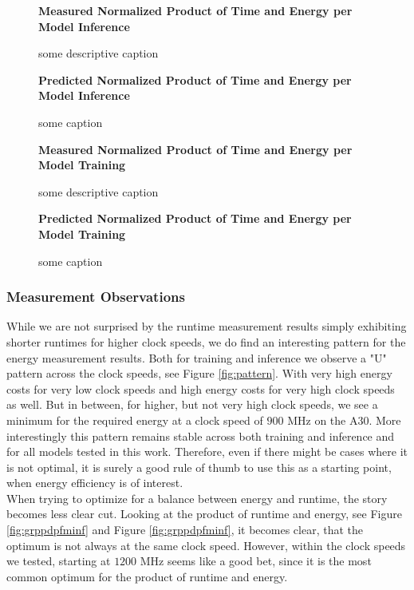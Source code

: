\begin{figure}[htbp]
    \centering
    \parbox{1.1\textwidth}{\centering\textbf{Measured Normalized Product of Time and Energy per Model Inference}}
    \caption{some descriptive caption}
    \label{fig:grppdpfminf}
    \vspace{0.2cm}
    \parbox{1.1\textwidth}{\centering\textbf{Predicted Normalized Product of Time and Energy per Model Inference}}
    \caption{some caption}
    \label{fig:grppdppredinf}
\end{figure}



\begin{figure}[htbp]
    \centering
    \parbox{1.1\textwidth}{\centering\textbf{Measured Normalized Product of Time and Energy per Model Training}}
    \caption{some descriptive caption}
    \label{fig:grppdpfmtrain}
    \vspace{0.2cm}
    \parbox{1.1\textwidth}{\centering\textbf{Predicted Normalized Product of Time and Energy per Model Training}}
    \caption{some caption}
    \label{fig:grppdppredtrain}
\end{figure}

\subsubsection{Measurement Observations}
While we are not surprised by the runtime measurement results simply exhibiting shorter runtimes for higher clock speeds, we do find an interesting pattern for the energy measurement results. Both for training and inference we observe a "U" pattern across the clock speeds, see Figure \ref{fig:pattern}. With very high energy costs for very low clock speeds and high energy costs for very high clock speeds as well. But in between, for higher, but not very high clock speeds, we see a minimum for the required energy at a clock speed of $900$ MHz on the A30. More interestingly this pattern remains stable across both training and inference and for all models tested in this work. Therefore, even if there might be cases where it is not optimal, it is surely a good rule of thumb to use this as a starting point, when energy efficiency is of interest. \\
When trying to optimize for a balance between energy and runtime, the story becomes less clear cut. Looking at the product of runtime and energy, see Figure \ref{fig:grppdpfminf} and Figure \ref{fig:grppdpfminf}, it becomes clear, that the optimum is not always at the same clock speed. However, within the clock speeds we tested, starting at $1200$ MHz seems like a good bet, since it is the most common optimum for the product of runtime and energy.

